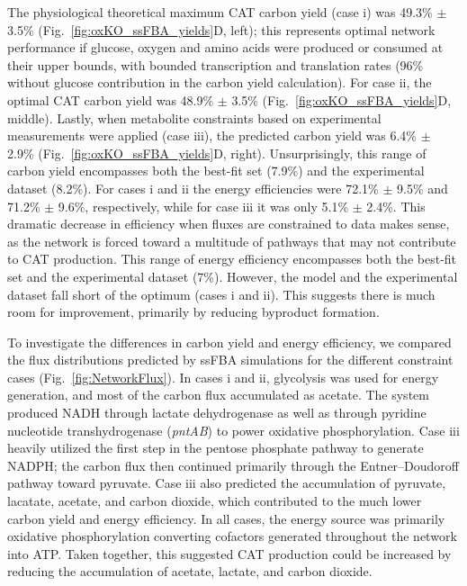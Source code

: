 \documentclass[12pt]{article}
\begin{document}
The physiological theoretical maximum CAT carbon yield (case i) was 49.3\% $\pm$ 3.5\% (Fig.~\ref{fig:oxKO_ssFBA_yields}D, left); this represents optimal network performance if glucose, oxygen and amino acids were produced or consumed at their upper bounds, with bounded transcription and translation rates (96\% without glucose contribution in the carbon yield calculation).
For case ii, the optimal CAT carbon yield was 48.9\% $\pm$ 3.5\% (Fig.~\ref{fig:oxKO_ssFBA_yields}D, middle).
Lastly, when metabolite constraints based on experimental measurements were applied (case iii), the predicted carbon yield was 6.4\% $\pm$ 2.9\% (Fig.~\ref{fig:oxKO_ssFBA_yields}D, right).
Unsurprisingly, this range of carbon yield encompasses both the best-fit set (7.9\%) and the experimental dataset (8.2\%).
For cases i and ii the energy efficiencies were 72.1\% $\pm$ 9.5\% and 71.2\% $\pm$ 9.6\%, respectively, while for case iii it was only 5.1\% $\pm$ 2.4\%.
This dramatic decrease in efficiency when fluxes are constrained to data makes sense, as the network is forced toward a multitude of pathways that may not contribute to CAT production.
This range of energy efficiency encompasses both the best-fit set and the experimental dataset (7\%).
However, the model and the experimental dataset fall short of the optimum (cases i and ii).
This suggests there is much room for improvement, primarily by reducing byproduct formation.

To investigate the differences in carbon yield and energy efficiency, we compared the flux distributions predicted by ssFBA simulations for the different constraint cases (Fig.~\ref{fig:NetworkFlux}).
In cases i and ii, glycolysis was used for energy generation, and most of the carbon flux accumulated as acetate.
The system produced NADH through lactate dehydrogenase as well as through pyridine nucleotide transhydrogenase (\textit{pntAB}) to power oxidative phosphorylation.
Case iii heavily utilized the first step in the pentose phosphate pathway to generate NADPH; the carbon flux then continued primarily through the Entner–Doudoroff pathway toward pyruvate.
Case iii also predicted the accumulation of pyruvate, lacatate, acetate, and carbon dioxide, which contributed to the much lower carbon yield and energy efficiency.
In all cases, the energy source was primarily oxidative phosphorylation converting cofactors generated throughout the network into ATP.
Taken together, this suggested CAT production could be increased by reducing the accumulation of acetate, lactate, and carbon dioxide.
\end{document}
